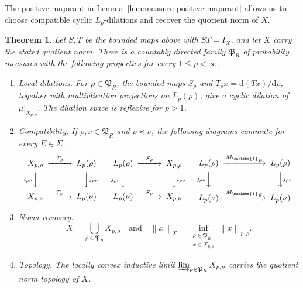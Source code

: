 \documentclass[11pt,leqno]{amsart}
\theoremstyle{compact}
\numberwithin{equation}{section}
\newtheorem{theorem}{Theorem}[section]
\theoremstyle{compactremark}
\theoremstyle{compact}
\newcommand{\1}{\mathbbm{1}}
\newcommand{\rmd}{\mathrm{d}}
\newcommand{\norm}[1]{\left\|#1\right\|}
\begin{document}
The positive majorant in Lemma~\ref{lem:measure-positive-majorant} allows us to choose compatible cyclic $L_p$-dilations and recover the quotient norm of $X$.

\begin{theorem}\label{thm:measure-inductive-dilation}
Let $S,T$ be the bounded maps above with $ST=I_X$, and let $X$ carry the stated quotient norm. There is a countably directed family $\mathfrak P_R$ of probability measures with the following properties for every $1\leq p<\infty$.
\begin{enumerate}[label=(\roman*),leftmargin=0pt,itemindent=2em]
\item Local dilations. For $\rho\in\mathfrak P_R$, the bounded maps $S_\rho$ and $T_\rho x=\rmd(Tx)/\rmd\rho$, together with multiplication projections on $L_p(\rho)$, give a cyclic dilation of $\mu|_{X_{p,\rho}}$. The dilation space is reflexive for $p>1$.
\item Compatibility. If $\rho,\nu\in\mathfrak P_R$ and $\rho\preceq\nu$, the following diagrams commute for every $E\in\Sigma$.
\[
\begin{CD}
    X_{p,\rho} @>{T_\rho}>> L_p(\rho)\\
    @V{i_{\rho\nu}}VV @VV{j_{\rho\nu}}V\\
    X_{p,\nu} @>{T_\nu}>> L_p(\nu)
\end{CD}
\qquad
\begin{CD}
    L_p(\rho) @>{S_\rho}>> X_{p,\rho}\\
    @V{j_{\rho\nu}}VV @VV{i_{\rho\nu}}V\\
    L_p(\nu) @>{S_\nu}>> X_{p,\nu}
\end{CD}
\qquad
\begin{CD}
    L_p(\rho) @>{M_{\1_E}}>> L_p(\rho)\\
    @V{j_{\rho\nu}}VV @VV{j_{\rho\nu}}V\\
    L_p(\nu) @>{M_{\1_E}}>> L_p(\nu)
\end{CD}
\]
\item Norm recovery.
\begingroup
\[
X=\bigcup_{\rho\in\mathfrak P_R}X_{p,\rho}\quad\text{and}\quad \norm{x}_X=\inf_{\substack{\rho\in\mathfrak P_R\\x\in X_{p,\rho}}}\norm{x}_{p,\rho}.
\]
\endgroup
\item Topology. The locally convex inductive limit $\varinjlim_{\rho\in\mathfrak P_R}X_{p,\rho}$ carries the quotient norm topology of $X$.
\end{enumerate}
\end{theorem}
\endgroup
\end{document}
